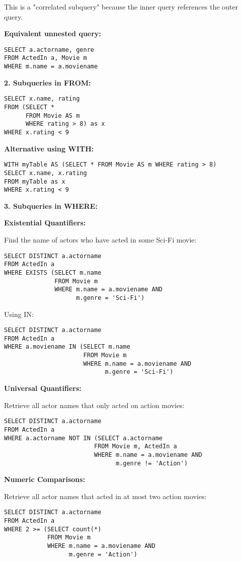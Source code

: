 \documentclass{article}
\begin{document}
This is a "correlated subquery" because the inner query references the outer query.

\textbf{Equivalent unnested query:}
\begin{verbatim}
SELECT a.actorname, genre
FROM ActedIn a, Movie m
WHERE m.name = a.moviename
\end{verbatim}

\textbf{2. Subqueries in FROM:}

\begin{verbatim}
SELECT x.name, rating
FROM (SELECT *
      FROM Movie AS m
      WHERE rating > 8) as x
WHERE x.rating < 9
\end{verbatim}

\textbf{Alternative using WITH:}
\begin{verbatim}
WITH myTable AS (SELECT * FROM Movie AS m WHERE rating > 8)
SELECT x.name, x.rating
FROM myTable as x
WHERE x.rating < 9
\end{verbatim}

\textbf{3. Subqueries in WHERE:}

\textbf{Existential Quantifiers:}

Find the name of actors who have acted in some Sci-Fi movie:
\begin{verbatim}
SELECT DISTINCT a.actorname
FROM ActedIn a
WHERE EXISTS (SELECT m.name
              FROM Movie m
              WHERE m.name = a.moviename AND
                    m.genre = 'Sci-Fi')
\end{verbatim}

Using IN:
\begin{verbatim}
SELECT DISTINCT a.actorname
FROM ActedIn a
WHERE a.moviename IN (SELECT m.name
                      FROM Movie m
                      WHERE m.name = a.moviename AND
                            m.genre = 'Sci-Fi')
\end{verbatim}

\textbf{Universal Quantifiers:}

Retrieve all actor names that only acted on action movies:
\begin{verbatim}
SELECT DISTINCT a.actorname
FROM ActedIn a
WHERE a.actorname NOT IN (SELECT a.actorname
                         FROM Movie m, ActedIn a
                         WHERE m.name = a.moviename AND
                               m.genre != 'Action')
\end{verbatim}

\textbf{Numeric Comparisons:}

Retrieve all actor names that acted in at most two action movies:
\begin{verbatim}
SELECT DISTINCT a.actorname
FROM ActedIn a
WHERE 2 >= (SELECT count(*)
            FROM Movie m
            WHERE m.name = a.moviename AND
                  m.genre = 'Action')
\end{verbatim}
\end{document}
